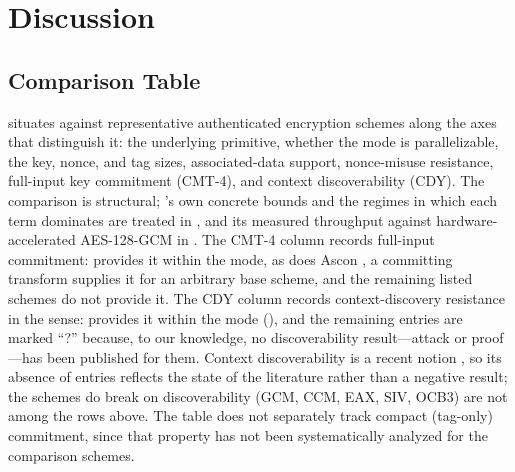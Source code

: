 \section{Discussion}
\label{sec:discussion}

\subsection{Comparison Table}
\label{sec:compare-table}

 situates \TW{} against representative authenticated
encryption schemes along the axes that distinguish it: the underlying primitive,
whether the mode is parallelizable, the key, nonce, and tag sizes, associated-data
support, nonce-misuse resistance, full-input key commitment (\textsf{CMT-4}), and
context discoverability (CDY).
The comparison is structural; \TW{}'s own concrete bounds and the regimes in
which each term dominates are treated in , and its
measured throughput against hardware-accelerated AES-128-GCM in
. The \textsf{CMT-4} column records full-input
commitment: \TW{} provides it within the mode, as does Ascon \cite{KSW23}, a
committing transform supplies it for an arbitrary base scheme, and the remaining
listed schemes do not provide it. The CDY column records context-discovery
resistance in the \cite{MLGR23} sense: \TW{} provides it within the mode
(), and the
remaining entries are marked ``?'' because, to our knowledge, no
discoverability result---attack or proof---has been published for them. Context
discoverability is a recent notion \cite{MLGR23}, so its absence of entries
reflects the state of the literature rather than a negative result; the schemes
\cite{MLGR23} do break on discoverability (\textsf{GCM}, \textsf{CCM},
\textsf{EAX}, \textsf{SIV}, \textsf{OCB3}) are not among the rows above.
The table does not separately track compact (tag-only) commitment, since
that property has not been systematically analyzed for the comparison
schemes.

